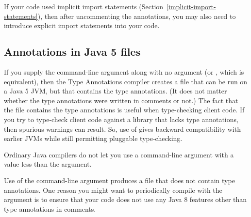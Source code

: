 If your code used implicit import statements
(Section~\ref{implicit-import-statements}), then after uncommenting the
annotations, you may also need to introduce
explicit import statements into your code.


\subsection{Annotations in Java 5  files\label{java5-class-files}}

If you supply the  command-line argument along with no
 argument (or , which is equivalent), then the
Type Annotations compiler creates a  file that can be run on a
Java 5 JVM, but that contains the type annotations.  (It does not matter
whether the type annotations were written in comments or not.)  The fact
that the  file contains the type annotations is useful when
type-checking client code.  If you try to type-check client code against a
library that lacks type annotations, then spurious warnings can result.
So, use of  gives backward compatibility with earlier JVMs
while still permitting pluggable type-checking.

Ordinary Java compilers do not let you use a  command-line
argument with a value less than the  argument.

Use of the  command-line argument produces a 
file that does not contain type annotations.  One reason you might want to
periodically compile with the  argument is to ensure that
your code does not use any Java 8 features other than type annotations in
comments.


